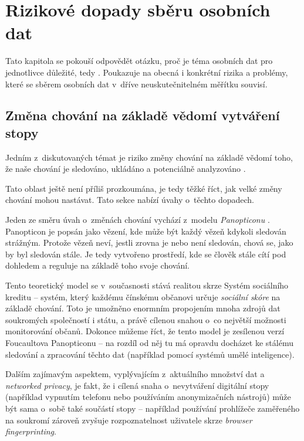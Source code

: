 \chapter{Rizikové dopady sběru osobních dat}

Tato kapitola se pokouší odpovědět otázku, proč je téma osobních dat pro jednotlivce důležité, tedy . Poukazuje na obecná i konkrétní rizika a problémy, které se sběrem osobních dat v~dříve neuskutečnitelném měřítku souvisí. 


\section{Změna chování na základě vědomí vytváření stopy}

Jedním z~diskutovaných témat je riziko změny chování na základě vědomí toho, že naše chování je sledováno, ukládáno a potenciálně analyzováno \citep{behavior-changes}.

Tato oblast ještě není příliš prozkoumána, je tedy těžké říct, jak velké změny chování mohou nastávat. Tato sekce nabízí úvahy o~těchto dopadech.

Jeden ze směru úvah o~změnách chování vychází z~modelu \textit{Panopticonu} \citep{panopticon}. Panopticon je popsán jako vězení, kde může být každý vězeň kdykoli sledován strážným. Protože vězeň neví, jestli zrovna je nebo není sledován, chová se, jako by byl sledován stále. Je tedy vytvořeno prostředí, kde se člověk stále cítí pod dohledem a reguluje na základě toho svoje chování.

Tento teoretický model se v~současnosti stává realitou skrze Systém sociálního kreditu -- systém, který každému čínskému občanovi určuje \textit{sociální skóre} na základě chování. Toto je umožněno enormním propojením mnoha zdrojů dat soukromých společností i státu, a právě cílenou snahou o~co největší možnosti monitorování občanů. Dokonce můžeme říct, že tento model je zesílenou verzí Foucaultova Panopticonu -- na rozdíl od něj tu má opravdu docházet ke stálému sledování a zpracování těchto dat (například pomocí systémů umělé inteligence).

Dalším zajímavým aspektem, vyplývajícím z~aktuálního množství dat a \textit{networked privacy}, je fakt, že i cílená snaha o~nevytváření digitální stopy (například vypnutím telefonu nebo používáním anonymizačních nástrojů) může být sama o~sobě také součástí stopy -- například používání prohlížeče zaměřeného na soukromí zároveň zvyšuje rozpoznatelnost uživatele skrze \textit{browser fingerprinting}.

